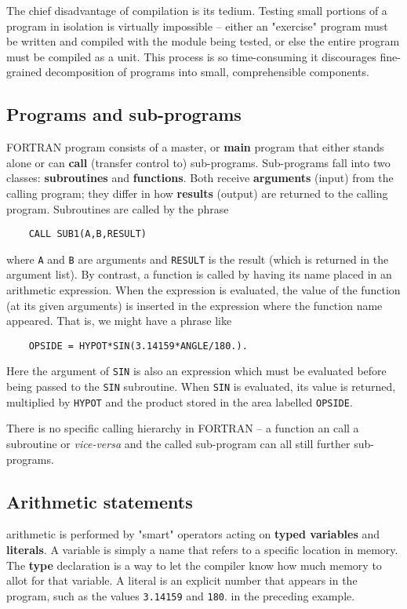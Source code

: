 The chief disadvantage of compilation is its tedium. Testing small portions of a program in isolation is virtually impossible -- either an "exercise" program must be written and compiled with the module being tested, or else the entire program must be compiled as a unit. This process is so time-consuming it discourages fine-grained decomposition of programs into small, comprehensible components.
 
\subsection{Programs and sub-programs} 
 FORTRAN program consists of a master, or \textbf{main} program that either stands alone or can \textbf{call} (transfer control to) sub-programs. Sub-programs fall into two classes: \textbf{subroutines} and \textbf{functions}. Both receive \textbf{arguments} (input) from the calling program; they differ in how \textbf{results} (output) are returned to the calling program. Subroutines are called by the phrase

\begin{verbatim}
    CALL SUB1(A,B,RESULT)
\end{verbatim}

where \verb|A| and \verb|B| are arguments and \verb|RESULT| is the result (which is returned in the argument list). By contrast, a function is called by having its name placed in an arithmetic expression. When the expression is evaluated, the value of the function (at its given arguments) is inserted in the expression where the function name appeared. That is, we might have a phrase like

\begin{verbatim}
    OPSIDE = HYPOT*SIN(3.14159*ANGLE/180.).
\end{verbatim}

Here the argument of \verb|SIN| is also an expression which must be evaluated before being passed to the \verb|SIN| subroutine. When \verb|SIN| is evaluated, its value is returned, multiplied by \verb|HYPOT| and the product stored in the area labelled \verb|OPSIDE|.

There is no specific calling hierarchy in FORTRAN -- a function an call a subroutine or \textit{vice-versa} and the called sub-program can all still further sub-programs.

\subsection{Arithmetic statements}
 arithmetic is performed by "smart" operators acting on \textbf{typed variables} and \textbf{literals}. A variable is simply a name that refers to a specific location in memory. The \textbf{type} declaration is a way to let the compiler know how much memory to allot for that variable. A literal is an explicit number that appears in the program, such as the values \verb|3.14159| and \verb|180|. in the preceding example.

